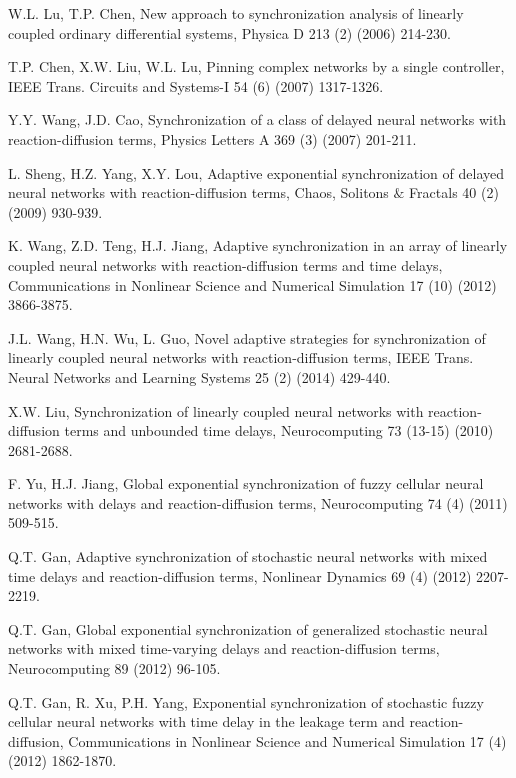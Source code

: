 \documentclass[review]{elsarticle}
\begin{document}
\begin{thebibliography}{99}
W.L. Lu, T.P. Chen, New approach to synchronization analysis of linearly coupled ordinary differential systems, Physica D 213 (2) (2006) 214-230.

T.P. Chen, X.W. Liu, W.L. Lu, Pinning complex networks by a single controller, IEEE Trans. Circuits and Systems-I 54 (6) (2007) 1317-1326.


Y.Y. Wang, J.D. Cao, Synchronization of a class of delayed neural networks with reaction-diffusion terms, Physics Letters A 369 (3) (2007) 201-211.

L. Sheng, H.Z. Yang, X.Y. Lou, Adaptive exponential synchronization of delayed neural networks with reaction-diffusion terms, Chaos, Solitons $\&$ Fractals 40 (2) (2009) 930-939.

K. Wang, Z.D. Teng, H.J. Jiang, Adaptive synchronization in an array of linearly coupled neural networks with reaction-diffusion terms and time delays, Communications in Nonlinear Science and Numerical Simulation 17 (10) (2012) 3866-3875.

J.L. Wang, H.N. Wu, L. Guo, Novel adaptive strategies for synchronization of linearly coupled neural networks with reaction-diffusion terms, IEEE Trans. Neural Networks and Learning Systems 25 (2) (2014) 429-440.

X.W. Liu, Synchronization of linearly coupled neural networks with reaction-diffusion terms and unbounded time delays, Neurocomputing 73 (13-15) (2010) 2681-2688.

F. Yu, H.J. Jiang, Global exponential synchronization of fuzzy cellular neural networks with delays and reaction-diffusion terms, Neurocomputing 74 (4) (2011) 509-515.

Q.T. Gan, Adaptive synchronization of stochastic neural networks with mixed time delays and reaction-diffusion terms, Nonlinear Dynamics 69 (4) (2012) 2207-2219.

Q.T. Gan, Global exponential synchronization of generalized stochastic neural networks with mixed time-varying delays and reaction-diffusion terms, Neurocomputing 89 (2012) 96-105.

Q.T. Gan, R. Xu, P.H. Yang, Exponential synchronization of stochastic fuzzy cellular neural networks with time delay in the leakage term and reaction-diffusion, Communications in Nonlinear Science and Numerical Simulation 17 (4) (2012) 1862-1870.


\end{thebibliography}
\end{document}
